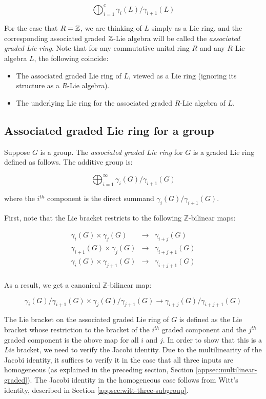 $$\bigoplus_{i=1}^c \gamma_i(L)/\gamma_{i+1}(L)$$

For the case that $R = \mathbb{Z}$, we are thinking of $L$ simply as a Lie
ring, and the corresponding associated graded $\mathbb{Z}$-Lie algebra will be
called the {\em associated graded Lie ring}. Note that for any
commutative unital ring $R$ and any $R$-Lie algebra $L$, the following
coincide:

\begin{itemize}
\item The associated graded Lie ring of $L$, viewed as a Lie ring
  (ignoring its structure as a $R$-Lie algebra).
\item The underlying Lie ring for the associated graded $R$-Lie
  algebra of $L$.
\end{itemize}


\subsection{Associated graded Lie ring for a group}

Suppose $G$ is a group. The {\em associated graded Lie ring} for $G$
is a graded Lie ring defined as follows. The additive group is:

$$\bigoplus_{i=1}^\infty \gamma_i(G)/\gamma_{i+1}(G)$$

where the $i^{th}$ component is the direct summand
$\gamma_i(G)/\gamma_{i+1}(G)$.

First, note that the Lie bracket restricts to the following
$\mathbb{Z}$-bilinear maps:

\begin{eqnarray*}
  \gamma_i(G) \times \gamma_j(G) & \to & \gamma_{i+j}(G)\\
  \gamma_{i+1}(G) \times \gamma_j(G) & \to & \gamma_{i+j+1}(G)\\
  \gamma_i(G) \times \gamma_{j+1}(G) & \to & \gamma_{i+j+1}(G)\\
\end{eqnarray*}

As a result, we get a canonical $\mathbb{Z}$-bilinear map:

$$\gamma_i(G)/\gamma_{i+1}(G) \times \gamma_j(G)/\gamma_{j+1}(G) \to \gamma_{i+j}(G)/\gamma_{i+j+1}(G)$$

The Lie bracket on the associated graded Lie ring of $G$ is defined as
the Lie bracket whose restriction to the bracket of the $i^{th}$
graded component and the $j^{th}$ graded component is the above map
for all $i$ and $j$. In order to show that this is a {\em Lie}
bracket, we need to verify the Jacobi identity. Due to the
multilinearity of the Jacobi identity, it suffices to verify it in the
case that all three inputs are homogeneous (as explained in the
preceding section, Section \ref{appsec:multilinear-graded}). The
Jacobi identity in the homogeneous case follows from Witt's identity,
described in Section \ref{appsec:witt-three-subgroup}.


